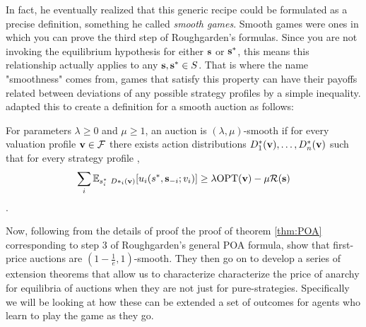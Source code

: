 \documentclass[12pt,twoside]{reedthesis}
\begin{document}
 In fact, he eventually realized that this generic recipe could be formulated as a precise definition, something he called {\em smooth games}. Smooth games were ones in which you can prove the third step of Roughgarden's formulas. Since you are not invoking the equilibrium hypothesis for either $\textbf{s}$ or $\textbf{s}^*$, this means this relationship actually applies to any $\textbf{s},\textbf{s}^* \in S$. That is where the name "smoothness" comes from, games that satisfy this property can have their payoffs related between deviations of any possible strategy profiles by a simple inequality. \cite{Syrgkanis2013} adapted this to create a definition for a smooth auction as follows:

\begin{dfn}
	For parameters $\lambda \geq 0$ and $\mu \geq 1$, an auction is $(\lambda, \mu)$-smooth if for every valuation profile $\textbf{v} \in \mathcal{F}$ there exists action distributions $D^*_1(\textbf{v}), \ldots, D^*_n(\textbf{v})$ such that for every strategy profile \strategies,
	$$ \sum_i \mathbb{E}_{s^*_i ~ D*_i(\textbf{v})}[u_i(s^*, \textbf{s}_{-i};v_i)] \geq \lambda \text{OPT}(\textbf{v}) - \mu \mathcal{R}(\textbf{s})$$.
	\label{dfn:smoothauction}
\end{dfn}


 Now, following from the details of proof the proof of theorem \ref{thm:POA} corresponding to step 3 of Roughgarden's general POA formula, \cite{Roughgarden2017} show that first-price auctions are $(1-\frac{1}{e}, 1)$-smooth. They then go on to develop a series of extension theorems that allow us to characterize characterize the price of anarchy for equilibria of auctions when they are not just for pure-strategies. Specifically we will be looking at how these can be extended a set of outcomes for agents who learn to play the game as they go.

\end{document}
